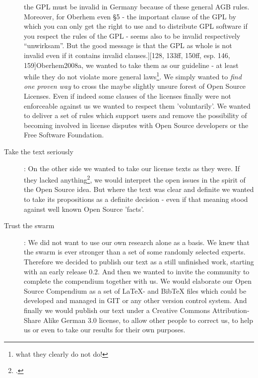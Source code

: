 \begin{description}
  the GPL must be invalid in Germany because of these general AGB rules.
  Moreover, for Oberhem even §5 - the important clause of the GPL by which you
  can only get the right to use and to distribute GPL software if you respect
  the rules of the GPL - seems also to be invalid respectively
  \enquote{unwirksam}. But the good message is that the GPL as whole is not
  invalid even if it contains invalid clauses.][128, 133ff, 150ff, esp. 146,
  159]{Oberhem2008a}, we wanted to take them as our guideline - at least while
  they do not violate more general laws\footnote{what they clearly do not do!}.
  We simply wanted to \emph{find one proven way} to cross the maybe slightly
  unsure forest of Open Source Licenses. Even if indeed some clauses of the
  licenses finally were not enforceable against us we wanted to respect them
  'voluntarily'. We wanted to deliver a set of rules which support users and
  remove the possibility of becoming involved in license disputes with Open
  Source developers or the Free Software Foundation.
  \item[Take the text seriously]: On the other side we wanted to take our
  license texts as they were. If they lacked anything\footcite[The systematical
  underdetermination of licenses is a problem being also known in the Open
  Source respectively Free Software movement. Following the biography of RMS his
  main judicial counselor Moglen has stated, that \enquote{there is uncertainty
  in every legal process (\ldots) } and that it seemed to be silly to try
  \enquote{(\ldots) to take out all the bugs (\ldots)}. Nevertheless - so
  Moglen resp. Williams - the goal of Richard Stallman was \enquote{the complete
  opposite}: He tried \enquote{(\ldots) to remove uncertainty which is
  inherently impossible}. But - and that's the nub of this analysis -
  Moglen had to follow Stallmann because of RMS character. And he had to
  summarize their work so, that \enquote{(\ldots) the resulting elegance (of the
  GPL; KR.), the resulting simplicity (of the GPL; KR.) in design almost
  achieves what it has to achieve}. Hence we are asked to take the license
  texts themselves seriously. cf.][177f]{Williams2002a}, we would interpret the
  open issues in the spirit of the Open Source idea. But where the text was
  clear and definite we wanted to take its propositions as a definite decision -
  even if that meaning stood against well known Open Source 'facts'.
  \item[Trust the swarm]: We did not want to use our own research alone as a
  basis. We knew that the swarm is ever stronger than a set of some randomly
  selected experts. Therefore we decided to publish our text as a still
  unfinished work, starting with an early release 0.2. And then we wanted
  to invite the community to complete the compendium together with us. We would elaborate our Open
  Source Compendium as a set of LaTeX- and BibTeX files which could be developed
  and managed in GIT or any other version control system. And finally we would
  publish our text under a Creative Commons Attribution-Share Alike German 3.0
  license, to allow other people to correct
  us, to help us or even to take our results for their own purposes.
\end{description}

